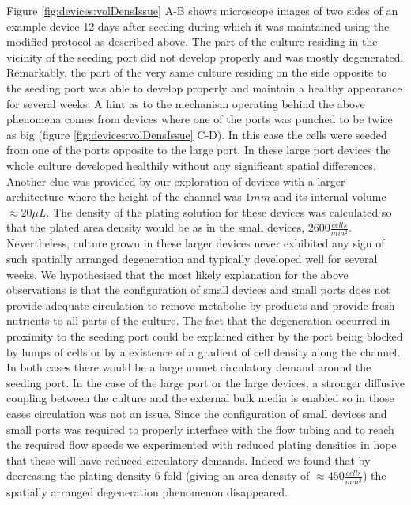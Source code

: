         Figure \ref{fig:devices:volDensIssue} A-B shows microscope images of two sides of an example device 12 days after seeding during which it was maintained using the modified protocol as described above. The part of the culture residing in the vicinity of the seeding port did not develop properly and was mostly degenerated. Remarkably, the part of the very same culture residing on the side opposite to the seeding port was able to develop properly and maintain a healthy appearance for several weeks. A hint as to the mechanism operating behind the above phenomena comes from devices where one of the ports was punched to be twice as big (figure \ref{fig:devices:volDensIssue} C-D). In this case the cells were seeded from one of the ports opposite to the large port. In these large port devices the whole culture developed healthily without any significant spatial differences. Another clue was provided by our exploration of devices with a larger architecture where the height of the channel was \(1 mm\) and its internal volume \(\approx 20 \mu L\). The density of the plating solution for these devices was calculated so that the plated area density would be as in the small devices, \(2600 \frac{cells}{mm^2}\). Nevertheless, culture grown in these larger devices never exhibited any sign of such spatially arranged degeneration and typically developed well for several weeks. We hypothesised that the most likely explanation for the above observations is that the configuration of small devices and small ports does not provide adequate circulation to remove metabolic by-products and provide fresh nutrients to all parts of the culture. The fact that the degeneration occurred in proximity to the seeding port could be explained either by the port being blocked by lumps of cells or by a existence of a gradient of cell density along the channel. In both cases there would be a large unmet circulatory demand around the seeding port. In the case of the large port or the large devices, a stronger diffusive coupling between the culture and the external bulk media is enabled so in those cases circulation was not an issue. Since the configuration of small devices and small ports was required to properly interface with the flow tubing and to reach the required flow speeds we experimented with reduced plating densities in hope that these will have reduced circulatory demands. Indeed we found that by decreasing the plating density 6 fold (giving an area density of \(\approx 450 \frac{cells}{mm^2}\)) the spatially arranged degeneration phenomenon disappeared.

